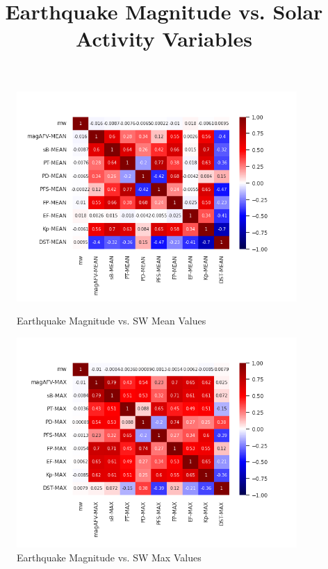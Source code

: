\documentclass[12pt]{article}
\begin{document}
\begin{figure}
\begin{large}
\title{Earthquake Magnitude vs. Solar Activity Variables}
\end{large}
\centering
  \includegraphics[width=0.95\textwidth]{corr-mw-MEAN.png}
  \caption{Earthquake Magnitude vs. SW Mean Values}

  \includegraphics[width=0.95\textwidth]{corr-mw-MAX.png}
  \caption{Earthquake Magnitude vs. SW Max Values}
\end{figure}

\newpage
\end{document}
